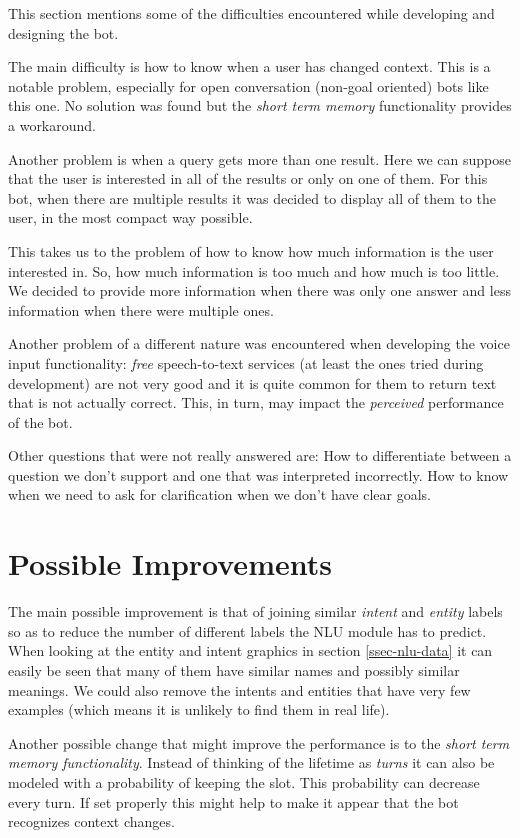 \documentclass[11pt,a4paper]{article}
\begin{document}
	This section mentions some of the difficulties encountered while developing and designing the bot.

	The main difficulty is how to know when a user has changed context. This is a notable problem, especially for open conversation (non-goal oriented) bots like this one. No solution was found but the \textit{short term memory} functionality provides a workaround.
	
	Another problem is when a query gets more than one result. Here we can suppose that the user is interested in all of the results or only on one of them. For this bot, when there are multiple results it was decided to display all of them to the user, in the most compact way possible.
	
	This takes us to the problem of how to know how much information is the user interested in. So, how much information is too much and how much is too little. We decided to provide more information when there was only one answer and less information when there were multiple ones.
	
	Another problem of a different nature was encountered when developing the voice input functionality: \textit{free} speech-to-text services (at least the ones tried during development) are not very good and it is quite common for them to return text that is not actually correct. This, in turn, may impact the \textit{perceived} performance of the bot. 
	
	Other questions that were not really answered are: How to differentiate between a question we don't support and one that was interpreted incorrectly. How to know when we need to ask for clarification when we don't have clear goals.


\section{Possible Improvements}
	
	The main possible improvement is that of joining similar \textit{intent} and \textit{entity} labels so as to reduce the number of different labels the NLU module has to predict. When looking at the entity and intent graphics in section \ref{ssec-nlu-data} it can easily be seen that many of them have similar names and possibly similar meanings. We could also remove the intents and entities that have very few examples (which means it is unlikely to find them in real life).
	
	Another possible change that might improve the performance is to the \textit{short term memory functionality}. Instead of thinking of the lifetime as \textit{turns} it can also be modeled with a probability of keeping the slot. This probability can decrease every turn. If set properly this might help to make it appear that the bot recognizes context changes. 
	
\end{document}
